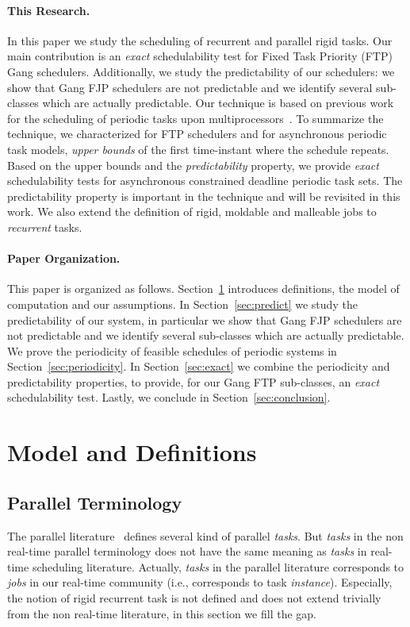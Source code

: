 \documentclass[a4paper]{article}
\begin{document}
\paragraph{This Research.}
In this paper we study the scheduling of recurrent and parallel rigid tasks. Our main contribution is an \emph{exact} schedulability test for Fixed Task Priority (FTP) Gang schedulers. Additionally, we study the predictability of our schedulers: we show that Gang FJP schedulers are not predictable and we identify several sub-classes which are actually predictable. Our technique is based on previous work for the scheduling of periodic tasks upon multiprocessors~\cite{dateLCJG07,etfaLCJG06}. To summarize the technique, we characterized for FTP schedulers and for asynchronous periodic task models, \emph{upper bounds} of the first time-instant where the schedule repeats. Based on the upper bounds and the \emph{predictability} property, we provide \emph{exact} schedulability tests for asynchronous constrained deadline periodic task sets. The predictability property is important in the technique and will be revisited in this work.
We also extend the definition of rigid, moldable and malleable jobs to \emph{recurrent} tasks.   

\paragraph{Paper Organization.}
This paper is organized as follows. Section~\ref{sec:model} introduces definitions, the model of computation and our assumptions. In Section~\ref{sec:predict} we study the predictability of our system, in particular we show that Gang FJP schedulers are not predictable and we identify several sub-classes which are actually predictable. We prove the periodicity of feasible schedules of periodic systems in Section~\ref{sec:periodicity}. In Section~\ref{sec:exact} we combine the periodicity and predictability properties, to provide, for our Gang FTP sub-classes, an \emph{exact} schedulability test. Lastly, we conclude in Section~\ref{sec:conclusion}.

\section{Model and Definitions}\label{sec:model}
\subsection{Parallel Terminology}
The parallel literature~\cite{Drozdowski2005Scheduling-Para, Buyya99, Feitelson96towardconvergence} defines several kind of parallel \emph{tasks}. But \emph{tasks} in the non real-time parallel terminology does not have the same meaning as \emph{tasks} in real-time scheduling literature. Actually, \emph{tasks} in the parallel literature corresponds to \emph{jobs} in our real-time community (i.e., corresponds to task \emph{instance}). Especially, the notion of rigid recurrent task is not defined and does not extend trivially from the non real-time literature, in this section we fill the gap.
\end{document}
